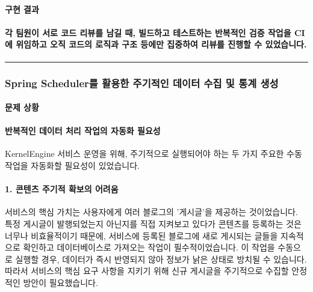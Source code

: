 \documentclass[12pt,a4paper]{article}
\newcommand{\divider}{%
    \vspace{0.5cm}%
    \begin{center}%
    \textcolor{lightgray}{\rule{0.2\textwidth}{0.5pt}}%
    \end{center}%
    \vspace{0.5cm}%
}
\begin{document}

    \paragraph{구현 결과}

    \paragraph{ 각 팀원이 서로 코드 리뷰를 남길 때, 빌드하고 테스트하는 반복적인 검증 작업을 CI에 위임하고 오직 코드의 로직과 구조 등에만 집중하여 리뷰를 진행할 수 있었습니다.}


    \divider
    \subsubsection{Spring Scheduler를 활용한 주기적인 데이터 수집 및 통계 생성}


    \paragraph{문제 상황}



    \paragraph{반복적인 데이터 처리 작업의 자동화 필요성} \par
    KernelEngine 서비스 운영을 위해, 주기적으로 실행되어야 하는 두 가지 주요한 수동 작업을 자동화할 필요성이 있었습니다.\\

    \vspace{1em}


    \paragraph{1. 콘텐츠 주기적 확보의 어려움} \par
    서비스의 핵심 가치는 사용자에게 여러 블로그의 '게시글'을 제공하는 것이었습니다. 특정 게시글이 발행되었는지 아닌지를 직접 지켜보고 있다가 콘텐츠를 등록하는 것은 너무나 비효율적이기 때문에, 서비스에 등록된 블로그에 새로 게시되는 글들을 지속적으로 확인하고 데이터베이스로 가져오는 작업이 필수적이었습니다. 이 작업을 수동으로 실행할 경우, 데이터가 즉시 반영되지 않아 정보가 낡은 상태로 방치될 수 있습니다. 따라서 서비스의 핵심 요구 사항을 지키기 위해 신규 게시글을 주기적으로 수집할 안정적인 방안이 필요했습니다.\\
\end{document}
